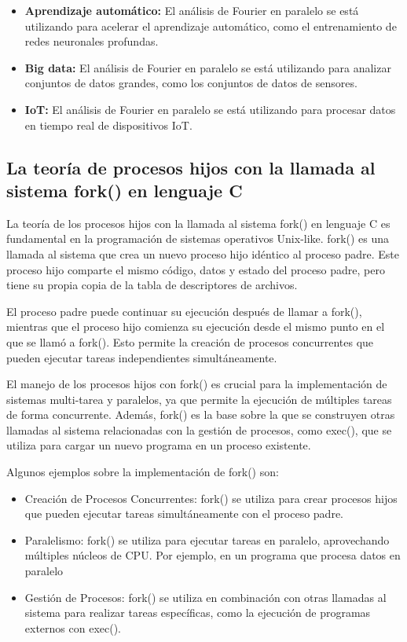 \begin{itemize} \item   \textbf{Aprendizaje automático:} El análisis de Fourier en paralelo se   está utilizando para acelerar el aprendizaje automático, como el   entrenamiento de redes neuronales profundas. \item   \textbf{Big data:} El análisis de Fourier en paralelo se está   utilizando para analizar conjuntos de datos grandes, como los   conjuntos de datos de sensores. \item   \textbf{IoT:} El análisis de Fourier en paralelo se está utilizando   para procesar datos en tiempo real de dispositivos IoT. \end{itemize}

\subsection{La teoría de procesos hijos con la llamada al sistema fork() en lenguaje C}\label{la-teoruxeda-de-procesos-hijos-con-la-llamada-al-sistema-fork-en-lenguaje-c}

La teoría de los procesos hijos con la llamada al sistema fork() en lenguaje C es fundamental en la programación de sistemas operativos Unix-like. fork() es una llamada al sistema que crea un nuevo proceso hijo idéntico al proceso padre. Este proceso hijo comparte el mismo código, datos y estado del proceso padre, pero tiene su propia copia de la tabla de descriptores de archivos.

El proceso padre puede continuar su ejecución después de llamar a fork(), mientras que el proceso hijo comienza su ejecución desde el mismo punto en el que se llamó a fork(). Esto permite la creación de procesos concurrentes que pueden ejecutar tareas independientes simultáneamente.

El manejo de los procesos hijos con fork() es crucial para la implementación de sistemas multi-tarea y paralelos, ya que permite la ejecución de múltiples tareas de forma concurrente. Además, fork() es la base sobre la que se construyen otras llamadas al sistema relacionadas con la gestión de procesos, como exec(), que se utiliza para cargar un nuevo programa en un proceso existente.

Algunos ejemplos sobre la implementación de fork() son:

\begin{itemize} \item   Creación de Procesos Concurrentes: fork() se utiliza para crear   procesos hijos que pueden ejecutar tareas simultáneamente con el   proceso padre. \item   Paralelismo: fork() se utiliza para ejecutar tareas en paralelo,   aprovechando múltiples núcleos de CPU. Por ejemplo, en un programa que   procesa datos en paralelo \item   Gestión de Procesos: fork() se utiliza en combinación con otras   llamadas al sistema para realizar tareas específicas, como la   ejecución de programas externos con exec(). \end{itemize}


